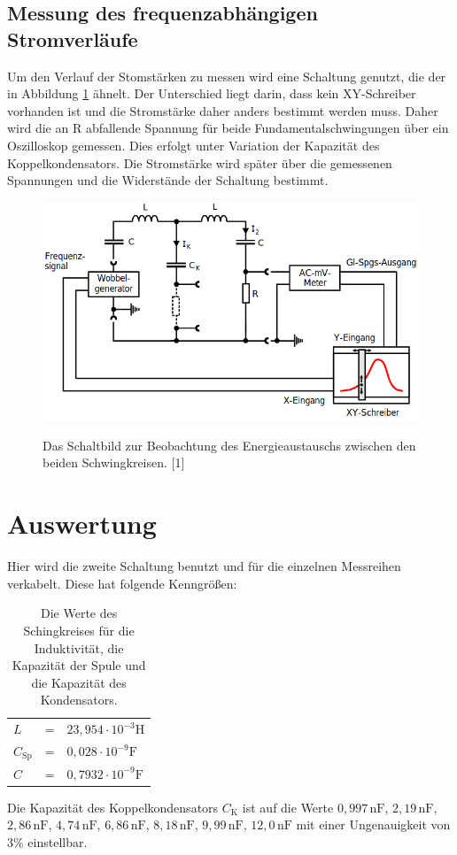 \documentclass[titlepage = firstcover]{scrartcl}
\begin{document}
    \subsection{Messung des frequenzabhängigen Stromverläufe}
          Um den Verlauf der Stomstärken zu messen wird eine Schaltung genutzt, die der in Abbildung \ref{fig:Stromverlauf} ähnelt. Der Unterschied liegt darin, dass kein 
          XY-Schreiber vorhanden ist und die Stromstärke daher anders bestimmt werden muss. Daher wird die an R abfallende Spannung  für beide 
          Fundamentalschwingungen über ein Oszilloskop gemessen. Dies erfolgt unter Variation der Kapazität des Koppelkondensators. Die Stromstärke wird 
          später über die gemessenen Spannungen und die Widerstände der Schaltung bestimmt. 
          \begin{figure}[h]
            \centering
            \caption{Das Schaltbild zur Beobachtung des Energieaustauschs zwischen den beiden Schwingkreisen. [1]}
            \includegraphics[width = 0.4\linewidth]{Stromverlauf.png}
            \label{fig:Stromverlauf}
          \end{figure}
    
    \section{Auswertung}
          Hier wird die zweite Schaltung benutzt und für die einzelnen Messreihen verkabelt. Diese hat folgende Kenngrößen:
          \begin{table}[h]
            \centering
            \caption{Die Werte des Schingkreises für die Induktivität, die Kapazität der Spule und die Kapazität des Kondensators.}
            \label{tab:TabelleWerte}
            \begin{tabular}{l c l}
                $L$ & = & $23,954 \cdot 10^{-3} \text{H}$ \\
                $C_\text{Sp}$ & = & $0,028 \cdot 10^{-9} \text{F}$ \\
                $C$ & = & $0,7932 \cdot 10^{-9} \text{F}$
            \end{tabular}
        \end{table}
        \FloatBarrier
        \noindent
        Die Kapazität des Koppelkondensators $C_\text{K}$ ist auf die Werte $0,997 \, \text{nF}$, $2,19 \, \text{nF}$, $2,86 \, \text{nF}$, $4,74 \, \text{nF}$,
        $6,86 \, \text{nF}$, $8,18 \, \text{nF}$, $9,99 \, \text{nF}$, $12,0 \, \text{nF}$ mit einer Ungenauigkeit von $3\%$ einstellbar.
\end{document}
